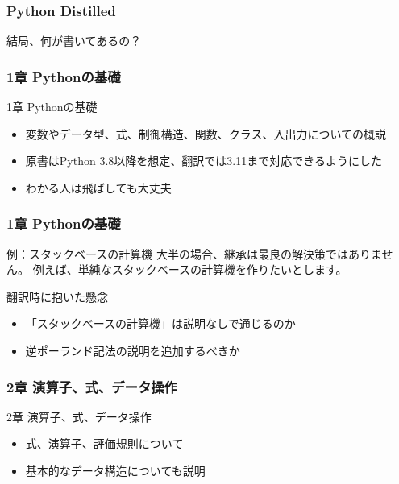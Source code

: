 \documentclass[aspectratio=169,dvipdfmx,12pt,notheorems]{beamer}
\theoremstyle{definition}
\begin{document}
\begin{frame}\frametitle{Python Distilled}

\begin{center}
\Huge{結局、何が書いてあるの？}
\end{center}

\end{frame}

\begin{frame}\frametitle{1章 Pythonの基礎}

\begin{block}{1章 Pythonの基礎}
\begin{itemize}
\item 変数やデータ型、式、制御構造、関数、クラス、入出力についての概説
\item 原書はPython 3.8以降を想定、翻訳では3.11まで対応できるようにした
\item わかる人は飛ばしても大丈夫
\end{itemize}
\end{block}

\end{frame}

\begin{frame}\frametitle{1章 Pythonの基礎}

\begin{exampleblock}{例：スタックベースの計算機}
大半の場合、継承は最良の解決策ではありません。
例えば、単純なスタックベースの計算機を作りたいとします。
\end{exampleblock}

\begin{alertblock}{翻訳時に抱いた懸念}
\begin{itemize}
\item 「スタックベースの計算機」は説明なしで通じるのか
\item 逆ポーランド記法の説明を追加するべきか
\end{itemize}
\end{alertblock}

\end{frame}

\begin{frame}\frametitle{2章 演算子、式、データ操作}

\begin{block}{2章 演算子、式、データ操作}
\begin{itemize}
\item 式、演算子、評価規則について
\item 基本的なデータ構造についても説明
\end{itemize}
\end{block}

\end{frame}
\end{document}
